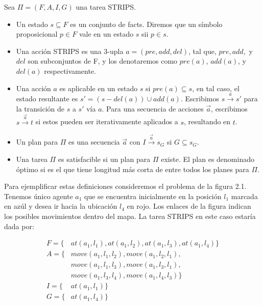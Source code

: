 \begin{mydef}
    Sea $\Pi = (F, A, I, G)$ una tarea STRIPS.
    
    \begin{itemize}
        \item Un estado $s \subseteq F$ es un conjunto de facts. Diremos que un
        símbolo proposicional $p \in F$ vale en un estado $s$ sii $p \in s$.
        
        \item Una acción STRIPS es una 3-upla $a = (pre, add, del)$, tal que,
        $pre, add,$ y $del$ son subconjuntos de F, y los denotaremos como $pre(a)$,
        $add(a)$, y $del(a)$ respectivamente.

        \item Una acción $a$ es aplicable en un estado $s$ si $pre(a) \subseteq
        s$, en tal caso, el estado resultante es $s' = (s - del(a)) \cup
        add(a)$. Escribimos $s \xrightarrow{a} s'$ para la transición de $s$ a
        $s'$ vía $a$. Para una secuencia de acciones $\vec{a}$, escribimos $s
        \xrightarrow{\vec{a}} t$ si estos pueden ser iterativamente aplicados a
        $s$, resultando en $t$.

        \item Un plan para $\Pi$ es una secuencia $\vec{a}$ con $I
        \xrightarrow{\vec{a}} s_G$ si $G \subseteq s_G$.
        
        \item Una tarea $\Pi$ es satisfacible si un plan para $\Pi$ existe. El
        plan es denominado óptimo si es el que tiene longitud más corta de entre
        todos los planes para $\Pi$.
    \end{itemize}
\end{mydef}

Para ejemplificar estas definiciones consideremos el problema de la figura 2.1.
Tenemos único agente $a_1$ que se encuentra inicialmente en la posición $l_1$
marcada en azúl y desea ir hacia la ubicación $l_4$ en rojo. Los enlaces de la
figura indican los posibles movimientos dentro del mapa. La tarea STRIPS en este
caso estaría dada por:

\begin{align*}
    F = \{&at(a_1, l_1), at(a_1, l_2), at(a_1, l_3), at(a_1, l_4)\} \\
    A = \{&move(a_1, l_1, l_2), move(a_1, l_2, l_1), \\
    & move(a_1, l_1, l_3), move(a_1, l_3, l_1),\\
    & move(a_1, l_3, l_4), move(a_1, l_4, l_3)\} \\
    I = \{&at(a_1, l_1)\} \\
    G = \{&at(a_1, l_4)\}
\end{align*}


